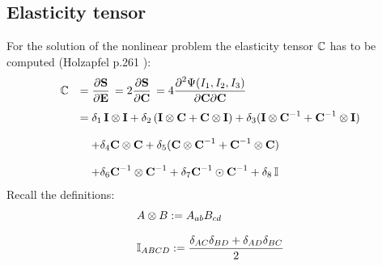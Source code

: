 \subsection{Elasticity tensor}
For the solution of the nonlinear problem the elasticity tensor $\mathbb{C}$ has to be computed (Holzapfel p.261  \cite{holzapfel2000nonlinear}):
\begin{equation*}
  \begin{array}{lll}
    \bbC &= \p{\bfS}{\bfE} = 2\p{\bfS}{\bfC} = 4\dfrac{\partial^2\Psi(I_1,I_2,I_3)}{\p\bfC\p\bfC}\\[4mm]
     &= \delta_1\,\bfI \otimes \bfI + \delta_2\,(\bfI \otimes \bfC + \bfC \otimes \bfI) + \delta_3 ( \bfI \otimes \bfC^{-1} + \bfC^{-1} \otimes \bfI)\\[4mm]
     &\quad +  \delta_4 \bfC \otimes \bfC + \delta_5(\bfC \otimes \bfC^{-1} + \bfC^{-1}\otimes \bfC) \\[4mm]
     & \quad + \delta_6 \bfC^{-1} \otimes \bfC^{-1} + \delta_7 \bfC^{-1} \odot \bfC^{-1} + \delta_8\,\bbI
  \end{array}
\end{equation*}
Recall the definitions:
\begin{equation*}
  \begin{array}{lll}
  A\otimes B := A_{ab}B_{cd} \\[4mm]
  \mathbb{I}_{ABCD} :=\displaystyle \frac{\delta_{AC}\delta_{BD}+\delta_{AD}\delta_{BC}}{2}
  \end{array}
\end{equation*}

